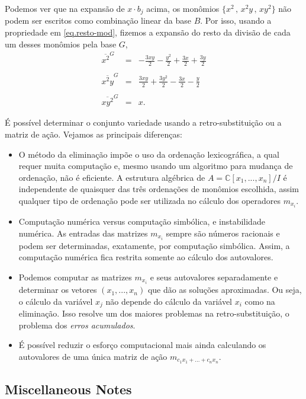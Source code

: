 Podemos ver que na expansão de $x\cdot b_j$ acima, os monômios $\{x^2\,,\,x^2y\,,\,xy^2\}$ não podem ser escritos como combinação linear da base $B$. Por isso, usando a propriedade em \ref{eq.resto-mod}, fizemos a expansão do resto da divisão de cada um desses monômios pela base $G$,
\begin{equation*}
\begin{array}{rcl}
\overline{x^2}^{G}&=&-\frac{3xy}{2}-\frac{y^2}{2}+\frac{3x}{2}+\frac{3y}{2}\\\\
\overline{x^2y}^{G}&=&\frac{3xy}{2}+\frac{3y^2}{2}-\frac{3x}{2}-\frac{y}{2}\\\\
\overline{xy^2}^{G}&=&x.
\end{array}
\end{equation*}

É possível determinar o conjunto variedade usando a retro-substituição ou a matriz de ação. Vejamos as principais diferenças:
\begin{itemize}
\item O método da eliminação impõe o uso da ordenação
lexicográfica, a qual requer muita computação e, mesmo usando um algoritmo para mudança de ordenação, não é eficiente. A estrutura algébrica de $A={\mathbb{C}}[x_1,...,x_n]/I$
é independente de quaisquer das três ordenações de monômios escolhida, assim qualquer tipo de ordenação pode ser utilizada no cálculo dos operadores $m_{x_i}$.
\item Computação numérica versus computação simbólica, e instabilidade numérica. As entradas das matrizes $m_{x_i}$ sempre são números racionais e podem ser determinadas, exatamente, por
computação simbólica. Assim, a computação numérica fica restrita somente ao cálculo dos
autovalores.
\item  Podemos computar as matrizes $m_{x_i}$ 
 e seus autovalores separadamente e determinar os
vetores $(x_1,...,x_n)$
 que dão as soluções aproximadas. Ou seja, o cálculo da variável $x_j$
não depende do cálculo da variável $x_i$
 como na eliminação. Isso resolve um dos maiores problemas na retro-substituição, o problema dos {\it erros acumulados}.

\item É possível reduzir o esforço computacional mais ainda calculando os autovalores de uma única matriz de ação $m_{c_1x_1+...+c_nx_n}$.

\end{itemize}

\subsection{Miscellaneous Notes}


